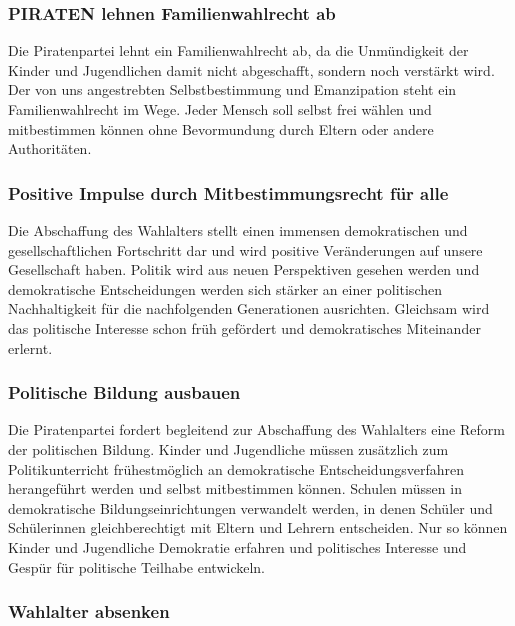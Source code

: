 \subsubsection{PIRATEN lehnen Familienwahlrecht ab}
\abstimmung
Die Piratenpartei lehnt ein Familienwahlrecht ab, da die Unmündigkeit der Kinder und Jugendlichen damit nicht abgeschafft, sondern noch verstärkt wird. Der von uns angestrebten Selbstbestimmung und Emanzipation steht ein Familienwahlrecht im Wege. Jeder Mensch soll selbst frei wählen und mitbestimmen können ohne Bevormundung durch Eltern oder andere Authoritäten.

\subsubsection{Positive Impulse durch Mitbestimmungsrecht für alle}
\abstimmung
Die Abschaffung des Wahlalters stellt einen immensen demokratischen und gesellschaftlichen Fortschritt dar und wird positive Veränderungen auf unsere Gesellschaft haben. Politik wird aus neuen Perspektiven gesehen werden und demokratische Entscheidungen werden sich stärker an einer politischen Nachhaltigkeit für die nachfolgenden Generationen ausrichten. Gleichsam wird das politische Interesse schon früh gefördert und demokratisches Miteinander erlernt.

\subsubsection{Politische Bildung ausbauen}
\abstimmung
Die Piratenpartei fordert begleitend zur Abschaffung des Wahlalters eine Reform der politischen Bildung. Kinder und Jugendliche müssen zusätzlich zum Politikunterricht frühestmöglich an demokratische Entscheidungsverfahren herangeführt werden und selbst mitbestimmen können. Schulen müssen in demokratische Bildungseinrichtungen verwandelt werden, in denen Schüler und Schülerinnen gleichberechtigt mit Eltern und Lehrern entscheiden. Nur so können Kinder und Jugendliche Demokratie erfahren und politisches Interesse und Gespür für politische Teilhabe entwickeln.
 
\label{wp:demokratie:wahlalter2}

\subsubsection{Wahlalter absenken}
\abstimmung


